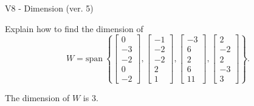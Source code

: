 \begin{exercise}
  \begin{exerciseTitle}V8 - Dimension (ver. 5)\end{exerciseTitle}
  \begin{exerciseStatement}
    Explain how to find the dimension of 
\[W=\mathrm{span}\ \left\{\left[\begin{array}{r}
0 \\
-3 \\
-2 \\
0 \\
-2
\end{array}\right] , \left[\begin{array}{r}
-1 \\
-2 \\
-2 \\
2 \\
1
\end{array}\right] , \left[\begin{array}{r}
-3 \\
6 \\
2 \\
6 \\
11
\end{array}\right] , \left[\begin{array}{r}
2 \\
-2 \\
2 \\
-3 \\
3
\end{array}\right]\right\}.\]



  \end{exerciseStatement}
  \begin{exerciseAnswer}
   The dimension of \(W\) is  \(3\).
  


  \end{exerciseAnswer}
\end{exercise}